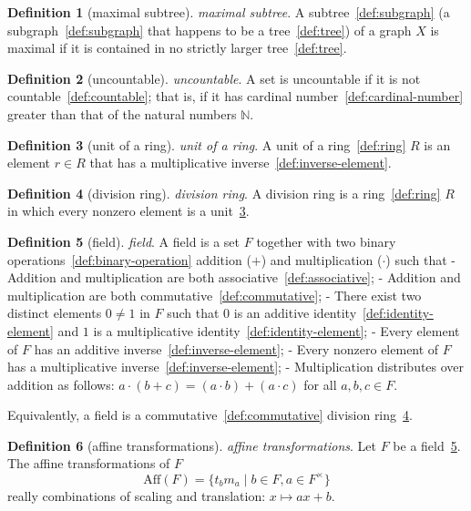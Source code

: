 \documentclass[12pt,a4paper]{article}
\theoremstyle{definition}
\newtheorem{definition}{Definition}
\begin{document}
\begin{definition}[maximal subtree]\label{def:maximal-subtree}
\emph{maximal subtree}. A subtree~\ref{def:subgraph} (a subgraph~\ref{def:subgraph} that happens to be a tree~\ref{def:tree}) of a graph $X$ is maximal if it is contained in no strictly larger tree~\ref{def:tree}.
\end{definition}

\begin{definition}[uncountable]\label{def:uncountable}
\emph{uncountable}. A set is uncountable if it is not countable~\ref{def:countable}; that is, if it has cardinal number~\ref{def:cardinal-number} greater than that of the natural numbers $\mathbb N$.
\end{definition}

\begin{definition}[unit of a ring]\label{def:unit-of-a-ring}
\emph{unit of a ring}. A unit of a ring~\ref{def:ring} $R$ is an element $r\in R$ that has a multiplicative inverse~\ref{def:inverse-element}.
\end{definition}

\begin{definition}[division ring]\label{def:division-ring}
\emph{division ring}. A division ring is a ring~\ref{def:ring} $R$ in which every nonzero element is a unit~\ref{def:unit-of-a-ring}.
\end{definition}

\begin{definition}[field]\label{def:field}
\emph{field}. A field is a set $F$ together with two binary operations~\ref{def:binary-operation} addition ($+$) and multiplication ($\cdot$) such that
- Addition and multiplication are both associative~\ref{def:associative};
- Addition and multiplication are both commutative~\ref{def:commutative};
- There exist two distinct elements $0\neq 1$ in $F$ such that $0$ is an additive identity~\ref{def:identity-element} and $1$ is a multiplicative identity~\ref{def:identity-element};
- Every element of $F$ has an additive inverse~\ref{def:inverse-element};
- Every nonzero element of $F$ has a multiplicative inverse~\ref{def:inverse-element};
- Multiplication distributes over addition as follows: $a\cdot (b+c) = (a\cdot b) + (a\cdot c)$ for all $a,b,c\in F$. 

Equivalently, a field is a commutative~\ref{def:commutative} division ring~\ref{def:division-ring}.
\end{definition}

\begin{definition}[affine transformations]\label{def:affine-transformations}
\emph{affine transformations}. Let $F$ be a field~\ref{def:field}.  The affine transformations of $F$$$\text{Aff}(F) = \{t_bm_a\mid b\in F, a\in F^\times\}$$ really combinations of scaling and translation: $x\mapsto ax+b$.
\end{definition}
\end{document}
